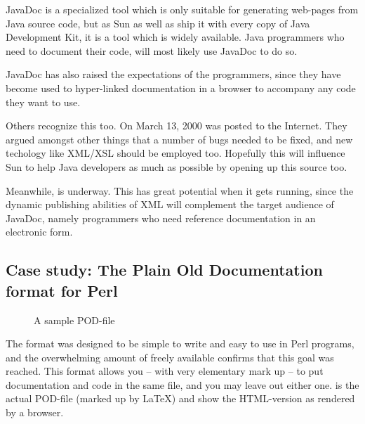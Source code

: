 JavaDoc is a specialized tool which is only suitable for generating
web-pages from Java source code, but as Sun
 as well as ship it with
every copy of Java Development Kit, it is a tool which is widely
available.  Java programmers who need to document their code, will most
likely use JavaDoc to do so.

JavaDoc has also raised the expectations of the programmers, since
they have become used to hyper-linked documentation in a browser to
accompany any code they want to use.  

Others recognize this too.  On March 13, 2000
 was posted to the Internet.  They argued
amongst other things that a number of bugs needed to be
fixed, and new techology like XML/XSL should be employed
too.  Hopefully this will influence Sun to help Java
developers as much as possible by opening up this source
too.

Meanwhile,  is underway.
This has great potential when it gets running, since the dynamic
publishing abilities of XML will complement the target audience of
  JavaDoc, namely programmers who need reference documentation in an
  electronic form.

\subsection{Case study: The Plain Old Documentation format for Perl}
\label{sec:perlpod}

\begin{figure}[htbp]
  \begin{center}
%
\caption{A sample POD-file}
    \label{fig:sample-pod-file}
  \end{center}
\end{figure}


The
format was designed to be simple to write and easy to use in
Perl programs, and the overwhelming amount of freely
available  confirms that this goal was reached.  This format
allows you -- with very elementary mark up -- to put
documentation and code in the same file, and you may leave
out either one.   is the
actual POD-file (marked up by \LaTeX) and
 show the HTML-version as
rendered by a browser.



